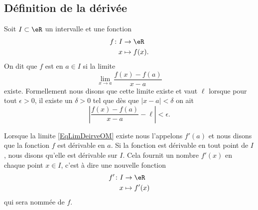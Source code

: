 \newcommand{\CaptionFigLesSubFigures}{Recherche de la tangente par approximations successives.}


\subsection{Définition de la dérivée}

Soit $I\subset\eR$ un intervalle et une fonction
\begin{equation}
	\begin{aligned}
		f\colon I&\to \eR \\
		x&\mapsto f(x). 
	\end{aligned}
\end{equation}
On dit que $f$ est  en $a\in I$ si la limite
\begin{equation}	\label{EqLimDeirveOM}
	\lim_{x\to a} \frac{ f(x)-f(a) }{ x-a }
\end{equation}
existe. Formellement nous disons que cette limite existe et vaut $\ell$ lorsque pour tout $\epsilon>0$, il existe un $\delta>0$ tel que dès que $| x-a |<\delta$ on ait
\begin{equation}
	\left| \frac{ f(x)-f(a) }{ x-a } -\ell \right| <\epsilon.
\end{equation}

Lorsque la limite \eqref{EqLimDeirveOM} existe nous l'appelons $f'(a)$ et nous disons que la fonction $f$ est dérivable en $a$. Si la fonction est dérivable en tout point de $I$, nous disons qu'elle est dérivable sur $I$. Cela fournit un nombre $f'(x)$ en chaque point $x\in I$, c'est à dire une nouvelle fonction
\begin{equation}
	\begin{aligned}
		f'\colon I&\to \eR \\
		x&\mapsto f'(x)
	\end{aligned}
\end{equation}
qui sera nommée  de $f$.

